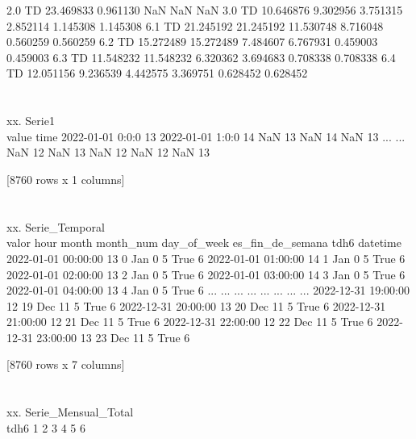 \documentclass[a4paper,10pt,twocolumn]{article}
\begin{document}
\begin{Form}
2.0 TD  23.469833   0.961130        NaN        NaN        NaN          
3.0 TD  10.646876   9.302956   3.751315   2.852114   1.145308  1.145308
6.1 TD  21.245192  21.245192  11.530748   8.716048   0.560259  0.560259
6.2 TD  15.272489  15.272489   7.484607   6.767931   0.459003  0.459003
6.3 TD  11.548232  11.548232   6.320362   3.694683   0.708338  0.708338
6.4 TD  12.051156   9.236539   4.442575   3.369751   0.628452  0.628452 \\\\\\xx. Serie1 \\                   value
time                   
2022-01-01 0:0:0     13
2022-01-01 1:0:0     14
NaN                  13
NaN                  14
NaN                  13
...                 ...
NaN                  12
NaN                  13
NaN                  12
NaN                  12
NaN                  13

[8760 rows x 1 columns] \\\\\\xx. Serie_Temporal \\                      valor  hour month  month_num  day_of_week  es_fin_de_semana  tdh6
datetime                                                                              
2022-01-01 00:00:00     13     0   Jan          0            5              True     6
2022-01-01 01:00:00     14     1   Jan          0            5              True     6
2022-01-01 02:00:00     13     2   Jan          0            5              True     6
2022-01-01 03:00:00     14     3   Jan          0            5              True     6
2022-01-01 04:00:00     13     4   Jan          0            5              True     6
...                    ...   ...   ...        ...          ...               ...   ...
2022-12-31 19:00:00     12    19   Dec         11            5              True     6
2022-12-31 20:00:00     13    20   Dec         11            5              True     6
2022-12-31 21:00:00     12    21   Dec         11            5              True     6
2022-12-31 22:00:00     12    22   Dec         11            5              True     6
2022-12-31 23:00:00     13    23   Dec         11            5              True     6

[8760 rows x 7 columns] \\\\\\xx. Serie_Mensual_Total \\ tdh6        1        2        3        4        5        6
                                                          

\end{Form}
\end{document}
